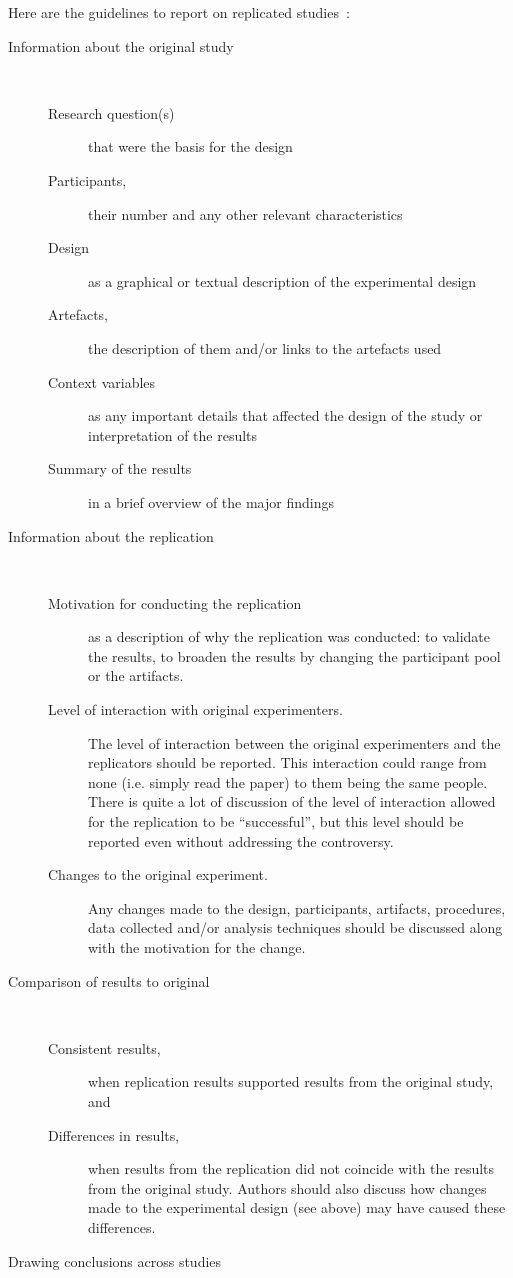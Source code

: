 \documentclass{uvamscse}
\begin{document}
Here are the guidelines to report on replicated studies~\cite{Carver10}:

\begin{description}
  \item[Information about the original study]~\\
    \begin{description}
    \item[Research question(s)] that were the basis for the design
    \item[Participants,] their number and any other relevant characteristics
    \item[Design] as a graphical or textual description of the experimental design
    \item[Artefacts,] the description of them and/or links to the artefacts used
    \item[Context variables] as any important details that affected the design of the study or interpretation of the
results
    \item[Summary of the results] in a brief overview of the major findings
    \end{description}
  \item[Information about the replication]~\\
    \begin{description}
    \item[Motivation for conducting the replication] as a
description of why the replication was conducted:
to validate the results, to broaden the results by
changing the participant pool or the artifacts.
    \item[Level of interaction with original experimenters.]
The level of interaction between the original experimenters and the
replicators should be reported. This interaction could range from none (i.e.
simply read the  paper) to them being the same people. There is quite a lot of
discussion of the level of interaction allowed for the replication to be
``successful'', but this level should be reported even without  addressing
the controversy.
    \item[Changes to the original experiment.] Any changes made to the
design, participants, artifacts, procedures, data collected and/or analysis
techniques should be  discussed along with the motivation for the change.
    \end{description}
  \item[Comparison of results to original]~\\
    \begin{description}
    \item[Consistent results,] when replication results supported
results from the original study, and
    \item[Differences in results,] when results from the replication
did not coincide with the results from the original study.
Authors should also discuss how changes made to the
experimental design (see above) may have caused
these differences.
    \end{description}
    \item[Drawing conclusions across studies]
\end{description}
\end{document}
